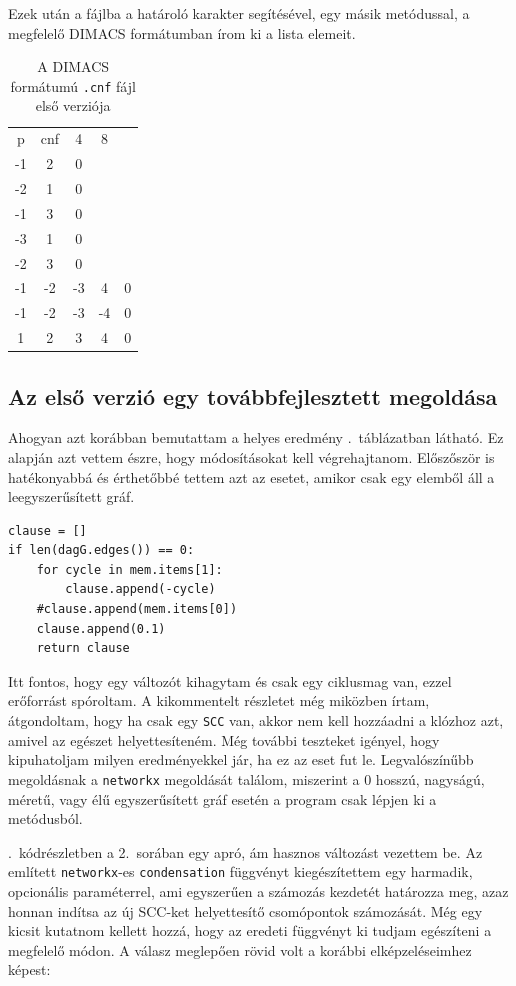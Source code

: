 \documentclass[
]{thesis-ekf}
\theoremstyle{definition}
\theoremstyle{remark}
\begin{document}
	Ezek után a fájlba a határoló karakter segítésével, egy másik metódussal, a megfelelő \textsc{DIMACS} formátumban írom ki a lista elemeit.

	\begin{table}[!ht]
		\centering
		\begin{tabular}{ccccc}
		p & cnf & 4 & 8 &   \\
		-1 &  2 &  0 & &\\
		-2 &  1 &  0 & &\\
		-1 &  3 &  0 & &\\
		-3 &  1 &  0 & &\\
		-2 &  3 &  0 & &\\
		-1 & -2 & -3 &  4 & 0\\
		-1 & -2 & -3 & -4 & 0\\
		 1 &  2 &  3 &  4 & 0\\
		\end{tabular}
		\caption{A \textsc{DIMACS} formátumú \texttt{.cnf} fájl első verziója}
	\end{table}
	
	\subsection{Az első verzió egy továbbfejlesztett megoldása}
	
	Ahogyan azt korábban bemutattam a helyes eredmény \az{\ref{table-esm-cnf}}.~táblázatban látható. Ez alapján azt vettem észre, hogy módosításokat kell végrehajtanom. Előszőször is hatékonyabbá és érthetőbbé tettem azt az esetet, amikor csak egy elemből áll a leegyszerűsített gráf.
	
	\begin{lstlisting}
clause = []
if len(dagG.edges()) == 0:
	for cycle in mem.items[1]:
		clause.append(-cycle)
	#clause.append(mem.items[0])
	clause.append(0.1)
	return clause
	\end{lstlisting}
	
	Itt fontos, hogy egy változót kihagytam és csak egy ciklusmag van, ezzel erőforrást spóroltam. A kikommentelt részletet még miközben írtam, átgondoltam, hogy ha csak egy \texttt{SCC} van, akkor nem kell hozzáadni a klózhoz azt, amivel az egészet helyettesíteném. Még további teszteket igényel, hogy kipuhatoljam milyen eredményekkel jár, ha ez az eset fut le. Legvalószínűbb megoldásnak a \texttt{networkx} megoldását találom, miszerint a 0 hosszú, nagyságú, méretű, vagy élű egyszerűsített gráf esetén a program csak lépjen ki a metódusból.
	
	\Az{\ref{kod-nx-condensation}}.~kódrészletben a 2.~sorában egy apró, ám hasznos változást vezettem be. Az említett \texttt{networkx}-es \texttt{condensation} függvényt kiegészítettem egy harmadik, opcionális paraméterrel, ami egyszerűen a számozás kezdetét határozza meg, azaz honnan indítsa az új \textsc{SCC}-ket helyettesítő csomópontok számozását. Még egy kicsit kutatnom kellett hozzá, hogy az eredeti függvényt ki tudjam egészíteni a megfelelő módon. A válasz meglepően rövid volt a korábbi elképzeléseimhez képest:
\end{document}
